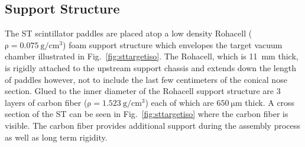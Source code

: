 \subsection{Support Structure} \label{sec:design_support}

The ST scintillator paddles are placed atop a low density Rohacell ($\mathrm{\rho = 0.075\ g/cm^{3}}$) foam support structure which envelopes the target vacuum chamber illustrated in Fig.~\ref{fig:sttargetiso}.
The Rohacell, which is 11~mm thick, is rigidly attached to the upstream support chassis and extends down the length of paddles however, not to include the last few centimeters of the conical nose section.  Glued to the inner diameter of the Rohacell support structure are 3 layers of carbon fiber ($\mathrm{\rho = 1.523\ g/cm^{3}}$) each of which are $\mathrm{650\ \mu m}$ thick.  A cross section of the ST can be seen in Fig.~\ref{fig:sttargetiso} where the carbon fiber is visible.  The carbon fiber provides additional support during the assembly process as well as long term rigidity.  

